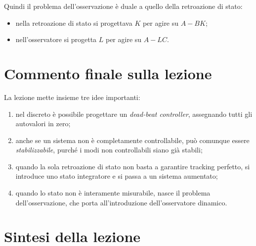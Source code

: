Quindi il problema dell'osservazione è duale a quello della retroazione di stato:
\begin{itemize}
    \item nella retroazione di stato si progettava \(K\) per agire su \(A-BK\);
    \item nell'osservatore si progetta \(L\) per agire su \(A-LC\).
\end{itemize}

\section{Commento finale sulla lezione}

La lezione mette insieme tre idee importanti:

\begin{enumerate}
    \item nel discreto è possibile progettare un \emph{dead-beat controller},
    assegnando tutti gli autovalori in zero;

    \item anche se un sistema non è completamente controllabile,
    può comunque essere \emph{stabilizzabile}, purché i modi non controllabili siano già stabili;

    \item quando la sola retroazione di stato non basta a garantire tracking perfetto,
    si introduce uno stato integratore e si passa a un sistema aumentato;

    \item quando lo stato non è interamente misurabile,
    nasce il problema dell'osservazione, che porta all'introduzione dell'osservatore dinamico.
\end{enumerate}

\section{Sintesi della lezione}

